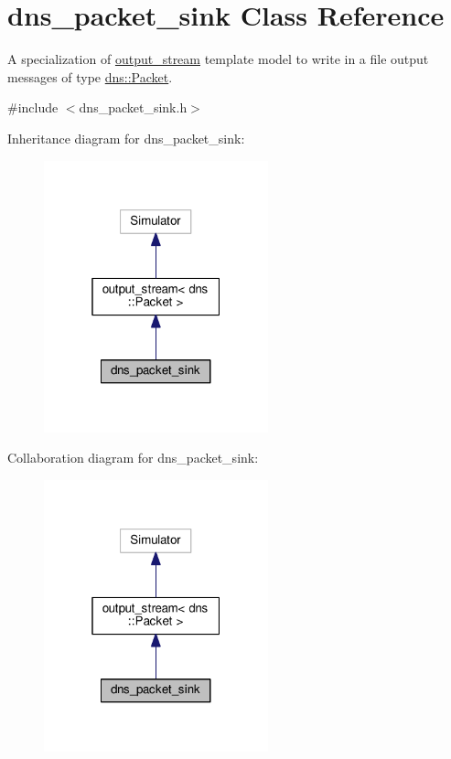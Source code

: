 \hypertarget{classdns__packet__sink}{}\section{dns\+\_\+packet\+\_\+sink Class Reference}
\label{classdns__packet__sink}


A specialization of \hyperlink{classoutput__stream}{output\+\_\+stream} template model to write in a file output messages of type \hyperlink{structdns_1_1Packet}{dns\+::\+Packet}.  




{\ttfamily \#include $<$dns\+\_\+packet\+\_\+sink.\+h$>$}



Inheritance diagram for dns\+\_\+packet\+\_\+sink\+:\nopagebreak
\begin{figure}[H]
\begin{center}
\leavevmode
\includegraphics[width=184pt]{classdns__packet__sink__inherit__graph}
\end{center}
\end{figure}


Collaboration diagram for dns\+\_\+packet\+\_\+sink\+:\nopagebreak
\begin{figure}[H]
\begin{center}
\leavevmode
\includegraphics[width=184pt]{classdns__packet__sink__coll__graph}
\end{center}
\end{figure}
